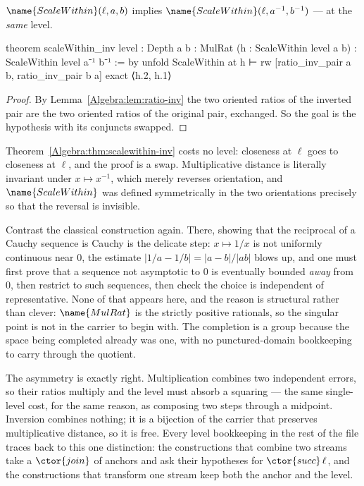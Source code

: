 \begin{theorem}\label{Algebra:thm:scalewithin-inv}
$\name{ScaleWithin}(\ell, a, b)$ implies
$\name{ScaleWithin}(\ell, a^{-1}, b^{-1})$ --- at the \emph{same} level.
\end{theorem}

\begin{leancode}
theorem scaleWithin_inv {level : Depth} {a b : MulRat}
    (h : ScaleWithin level a b) :
    ScaleWithin level a⁻¹ b⁻¹ := by
  unfold ScaleWithin at h ⊢
  rw [ratio_inv_pair a b, ratio_inv_pair b a]
  exact ⟨h.2, h.1⟩
\end{leancode}

\begin{proof}
By Lemma~\ref{Algebra:lem:ratio-inv} the two oriented ratios of the inverted
pair are the two oriented ratios of the original pair, exchanged.  So the goal
is the hypothesis with its conjuncts swapped.
\end{proof}

\begin{designnote}
\label{Algebra:note:isometry}
Theorem~\ref{Algebra:thm:scalewithin-inv} costs no level: closeness at $\ell$
goes to closeness at $\ell$, and the proof is a swap.  Multiplicative distance
is literally invariant under $x \mapsto x^{-1}$, which merely reverses
orientation, and $\name{ScaleWithin}$ was defined symmetrically in the two
orientations precisely so that the reversal is invisible.

Contrast the classical construction again.  There, showing that the reciprocal
of a Cauchy sequence is Cauchy is the delicate step: $x \mapsto 1/x$ is not
uniformly continuous near $0$, the estimate
$\lvert 1/a - 1/b\rvert = \lvert a-b\rvert / \lvert ab\rvert$ blows up, and one
must first prove that a sequence not asymptotic to $0$ is eventually bounded
\emph{away} from $0$, then restrict to such sequences, then check the choice is
independent of representative.  None of that appears here, and the reason is
structural rather than clever: $\name{MulRat}$ is the strictly positive
rationals, so the singular point is not in the carrier to begin with.  The
completion is a group because the space being completed already was one, with
no punctured-domain bookkeeping to carry through the quotient.
\end{designnote}

\begin{remark}
\label{Algebra:rem:level-cost}
The asymmetry is exactly right.  Multiplication combines two independent
errors, so their ratios multiply and the level must absorb a squaring --- the
same single-level cost, for the same reason, as composing two steps through a
midpoint.  Inversion combines nothing; it is a bijection of the carrier that
preserves multiplicative distance, so it is free.  Every level bookkeeping in
the rest of the file traces back to this one distinction: the constructions
that combine two streams take a $\ctor{join}$ of anchors and ask their
hypotheses for $\ctor{succ}\,\ell$, and the constructions that transform one
stream keep both the anchor and the level.
\end{remark}

